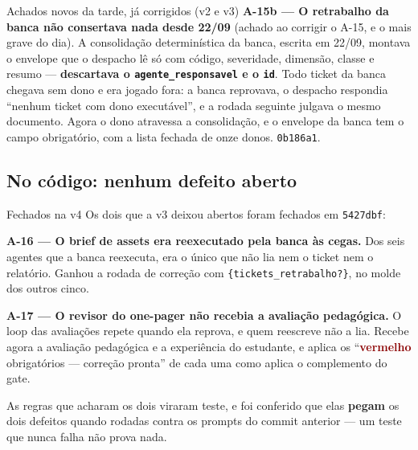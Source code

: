 \documentclass[11pt,a4paper]{article}
\newcommand{\vermelho}{\textcolor{DarkRed}{\textbf{vermelho}}}
\begin{document}
\begin{sucessobox}{Achados novos da tarde, já corrigidos (v2 e v3)}
\medskip
\textbf{A-15b --- O retrabalho da banca não consertava nada desde 22/09} (achado ao corrigir o A-15, e o mais grave do dia). A consolidação determinística da banca, escrita em 22/09, montava o envelope que o despacho lê só com código, severidade, dimensão, classe e resumo --- \textbf{descartava o \texttt{agente\_responsavel} e o \texttt{id}}. Todo ticket da banca chegava sem dono e era jogado fora: a banca reprovava, o despacho respondia ``nenhum ticket com dono executável'', e a rodada seguinte julgava o mesmo documento. Agora o dono atravessa a consolidação, e o envelope da banca tem o campo obrigatório, com a lista fechada de onze donos. \texttt{0b186a1}.
\end{sucessobox}

\subsection{No código: nenhum defeito aberto}

\begin{sucessobox}{Fechados na v4}
Os dois que a v3 deixou abertos foram fechados em \texttt{5427dbf}:

\medskip
\textbf{A-16 --- O brief de assets era reexecutado pela banca às cegas.} Dos seis agentes que a banca reexecuta, era o único que não lia nem o ticket nem o relatório. Ganhou a rodada de correção com \texttt{\{tickets\_retrabalho?\}}, no molde dos outros cinco.

\medskip
\textbf{A-17 --- O revisor do one-pager não recebia a avaliação pedagógica.} O loop das avaliações repete quando ela reprova, e quem reescreve não a lia. Recebe agora a avaliação pedagógica e a experiência do estudante, e aplica os ``\vermelho{} obrigatórios --- correção pronta'' de cada uma como aplica o complemento do gate.

\medskip
As regras que acharam os dois viraram teste, e foi conferido que elas \textbf{pegam} os dois defeitos quando rodadas contra os prompts do commit anterior --- um teste que nunca falha não prova nada.
\end{sucessobox}
\end{document}
